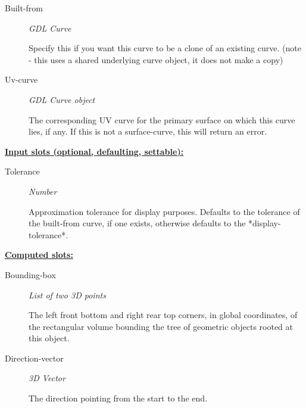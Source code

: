 \documentclass [11pt]{book}
\begin{document}
\begin{itemize}
\begin{description}

\item [Built-from]
\emph{GDL Curve}

 Specify this if you want this curve to be a clone of
an existing curve. (note - this uses a shared underlying curve object,
it does not make a copy)




\item [Uv-curve]
\emph{GDL Curve object}

 The corresponding UV curve for the primary surface on which this curve lies, if any. If
this is not a surface-curve, this will return an error.




\end{description}






\textbf{
\underline{Input slots (optional, defaulting, settable):}}

\begin{description}

\item [Tolerance]
\emph{Number}

 Approximation tolerance for display purposes. Defaults to the tolerance of the
built-from curve, if one exists, otherwise defaults to the *display-tolerance*.




\end{description}






\textbf{
\underline{Computed slots:}}

\begin{description}

\item [Bounding-box]
\emph{List of two 3D points}

 The left front bottom and right rear top corners, in global coordinates,
of the rectangular volume bounding the tree of geometric objects rooted at this object.




\item [Direction-vector]
\emph{3D Vector}

 The direction pointing from the start to the end.





\end{description}
\end{itemize}
\end{document}
